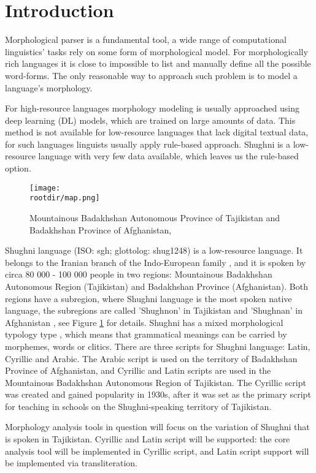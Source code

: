 \section{Introduction}

\par Morphological parser is a fundamental tool, a wide range of computational linguistics' tasks rely on some form of morphological model. For morphologically rich languages it is close to impossible to list and manually define all the possible word-forms. The only reasonable way to approach such problem is to model a language's morphology. 
\par For high-resource languages morphology modeling is usually approached using deep learning (DL) models, which are trained on large amounts of data. This method is not available for low-resource languages that lack digital textual data, for such languages linguists usually apply rule-based approach. Shughni is a low-resource language with very few data available, which leaves us the rule-based option.
\begin{figure}[!b]
    \centering
    \texttt{[image: \\rootdir/map.png]}
    \caption{Mountainous Badakhshan Autonomous Province of Tajikistan and Badakhshan Province of Afghanistan, \parencite[Fig 1.1]{parker_shughni_2023}}
    \label{fig:map1}
\end{figure}
\par Shughni language (ISO: sgh; glottolog: shug1248) is a low-resource language. It belongs to the Iranian branch of the Indo-European family \parencite[12]{plungian_study_2022}, and it is spoken by circa 80 000 - 100 000 people \parencite{edelman_dodykhudoeva_shughni_2009} in two regions: Mountainous Badakhshan Autonomous Region (Tajikistan) and Badakhshan Province (Afghanistan). Both regions have a subregion, where Shughni language is the most spoken native language, the subregions are called 'Shughnon' in Tajikistan and 'Shughnan' in Afghanistan \parencite[2]{parker_shughni_2023}, see Figure \ref{fig:map1} for details. Shughni has a mixed morphological typology type \parencite[94]{parker_shughni_2023}, which means that grammatical meanings can be carried by morphemes, words or clitics. There are three scripts for Shughni language: Latin, Cyrillic and Arabic. The Arabic script is used on the territory of Badakhshan Province of Afghanistan, and Cyrillic and Latin scripts are used in the Mountainous Badakhshan Autonomous Region of Tajikistan. The Cyrillic script was created and gained popularity in 1930s, after it was set as the primary script for teaching in schools on the Shughni-speaking territory of Tajikistan.
\par Morphology analysis tools in question will focus on the variation of Shughni that is spoken in Tajikistan. Cyrillic and Latin script will be supported: the core analysis tool will be implemented in Cyrillic script, and Latin script support will be implemented via transliteration.